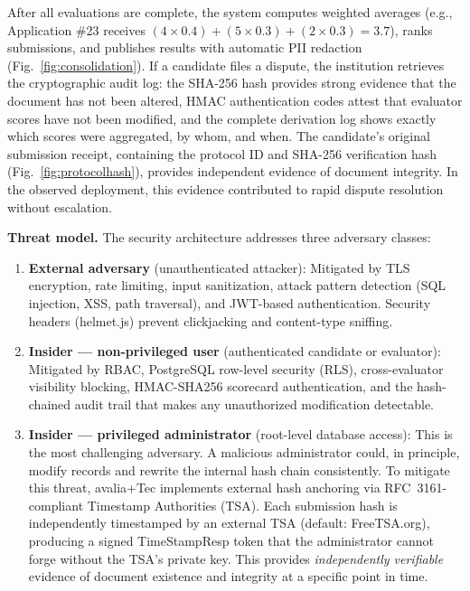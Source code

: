 \documentclass[preprint,12pt,a4paper]{elsarticle}
\begin{document}
After all evaluations are complete, the system computes weighted averages (e.g., Application \#23 receives $(4 \times 0.4) + (5 \times 0.3) + (2 \times 0.3) = 3.7$), ranks submissions, and publishes results with automatic PII redaction (Fig.~\ref{fig:consolidation}). If a candidate files a dispute, the institution retrieves the cryptographic audit log: the SHA-256 hash provides strong evidence that the document has not been altered, HMAC authentication codes attest that evaluator scores have not been modified, and the complete derivation log shows exactly which scores were aggregated, by whom, and when. The candidate's original submission receipt, containing the protocol ID and SHA-256 verification hash (Fig.~\ref{fig:protocolhash}), provides independent evidence of document integrity. In the observed deployment, this evidence contributed to rapid dispute resolution without escalation.

\textbf{Threat model.} The security architecture addresses three adversary classes:

\begin{enumerate}
  \item \textbf{External adversary} (unauthenticated attacker): Mitigated by TLS encryption, rate limiting, input sanitization, attack pattern detection (SQL injection, XSS, path traversal), and JWT-based authentication. Security headers (helmet.js) prevent clickjacking and content-type sniffing.
  \item \textbf{Insider --- non-privileged user} (authenticated candidate or evaluator): Mitigated by RBAC, PostgreSQL row-level security (RLS), cross-evaluator visibility blocking, HMAC-SHA256 scorecard authentication, and the hash-chained audit trail that makes any unauthorized modification detectable.
  \item \textbf{Insider --- privileged administrator} (root-level database access): This is the most challenging adversary. A malicious administrator could, in principle, modify records and rewrite the internal hash chain consistently. To mitigate this threat, avalia+Tec implements external hash anchoring via RFC~3161-compliant Timestamp Authorities (TSA). Each submission hash is independently timestamped by an external TSA (default: FreeTSA.org), producing a signed TimeStampResp token that the administrator cannot forge without the TSA's private key. This provides \emph{independently verifiable} evidence of document existence and integrity at a specific point in time.
\end{enumerate}
\end{document}
